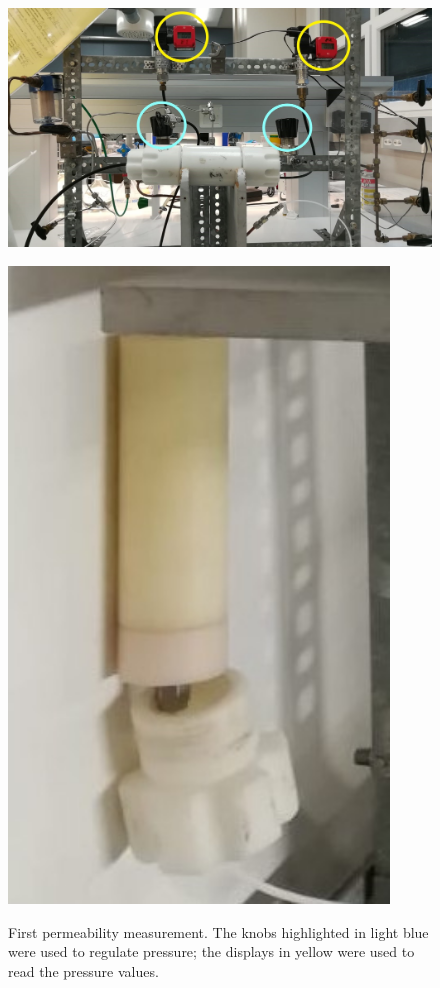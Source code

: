 \documentclass[10pt, a4paper]{amsart}
\begin{document}
\begin{figure}[!h]
    \centering
    \begin{minipage}{0.8\textwidth}
        \includegraphics[width=\textwidth]{perm1_2.jpeg}
        \label{f:perm1}
    \end{minipage}\hfill
    \begin{minipage}{0.2\textwidth}
        \centering
        \includegraphics[angle=90,width=0.9\textwidth]{perm1_1.jpeg}
        \label{f:perm1_detail}
    \end{minipage}
    \caption{First permeability measurement. The knobs highlighted in light blue were used to regulate pressure; the displays in yellow were used to read the pressure values.}
\end{figure}
\end{document}
